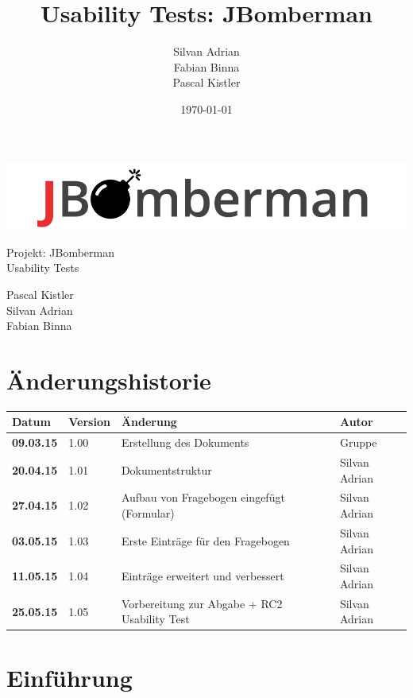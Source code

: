 \documentclass[11pt]{scrartcl}
\title{Usability Tests: JBomberman}
\author{Silvan Adrian \\ Fabian Binna \\ Pascal Kistler}
\date{\today{}}
\begin{document}
\def\arraystretch{1.5}
\begin{titlepage}
\begin{center}
\vspace{10em}
\includegraphics[scale=2]{jbomberman}
\vspace{10em}
\end{center}
\begin{center}
\huge {Projekt: JBomberman} \\
\huge {Usability Tests}
\end{center}
\begin{center}
\vspace{10em}
\LARGE {Pascal Kistler} \\
\LARGE {Silvan Adrian} \\
\LARGE {Fabian Binna}
\end{center}

\end{titlepage}

\newpage
\section{Änderungshistorie}
\label{sec:Änderungen}

\begin{tabularx}{\linewidth}{l l l l}
\textbf{Datum} & \textbf{Version} & \textbf{Änderung}  & \textbf{Autor} \\
\hline
\textbf{09.03.15} & 1.00 & Erstellung des Dokuments & Gruppe \\
\textbf{20.04.15} & 1.01 & Dokumentstruktur & Silvan Adrian \\
\textbf{27.04.15} & 1.02 & Aufbau von Fragebogen eingefügt (Formular) & Silvan Adrian \\
\bf{03.05.15} & 1.03 & Erste Einträge für den Fragebogen & Silvan Adrian \\
\bf{11.05.15} & 1.04 & Einträge erweitert und verbessert & Silvan Adrian \\
\bf{25.05.15} & 1.05 & Vorbereitung zur Abgabe + RC2 Usability Test & Silvan Adrian\\
\end{tabularx}

\newpage
\tableofcontents
\newpage
\section{Einführung}
\end{document}
